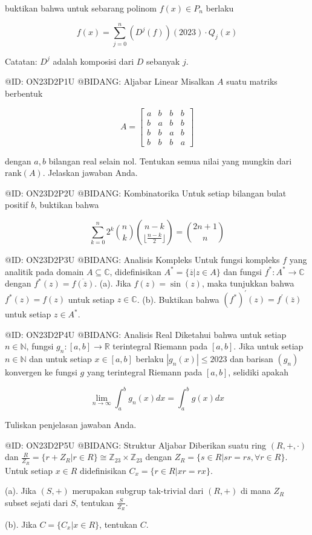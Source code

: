 buktikan bahwa untuk sebarang polinom $f(x)\in P_{n}$ berlaku

$$
f(x)=\sum_{j=0}^{n}(D^{j}(f))(2023)\cdot Q_{j}(x)
$$

Catatan: $D^{j}$ adalah komposisi dari $D$ sebanyak $j$.

@ID: ON23D2P1U
@BIDANG: Aljabar Linear
Misalkan $A$ suatu matriks berbentuk

$$
A=\begin{bmatrix}a&b&b&b\\ b&a&b&b\\ b&b&a&b\\ b&b&b&a\end{bmatrix}
$$

dengan $a, b$ bilangan real selain nol. Tentukan semua nilai yang mungkin dari $\text{rank}(A)$. Jelaskan jawaban Anda.

@ID: ON23D2P2U
@BIDANG: Kombinatorika
Untuk setiap bilangan bulat positif $b$, buktikan bahwa

$$
\sum_{k=0}^{n}2^{k}\binom{n}{k}\binom{n-k}{\lfloor\frac{n-k}{2}\rfloor}=\binom{2n+1}{n}
$$

@ID: ON23D2P3U
@BIDANG: Analisis Kompleks
Untuk fungsi kompleks $f$ yang analitik pada domain $A\subseteq\mathbb{C}$, didefinisikan $A^{*}=\{\overline{z}|z\in A\}$ dan fungsi $f^{*}:A^{*}\rightarrow\mathbb{C}$ dengan $f^{*}(z)=\overline{f(\overline{z})}$.
(a). Jika $f(z)=\sin(z)$, maka tunjukkan bahwa $f^{*}(z)=f(z)$ untuk setiap $z\in\mathbb{C}$.
(b). Buktikan bahwa $(f^{*})^{\prime}(z)=f^{\prime}(\overline{z})$ untuk setiap $z\in A^{*}$.

@ID: ON23D2P4U
@BIDANG: Analisis Real
Diketahui bahwa untuk setiap $n\in\mathbb{N}$, fungsi $g_{n}:[a,b]\rightarrow\mathbb{R}$ terintegral Riemann pada $[a,b]$. Jika untuk setiap $n\in\mathbb{N}$ dan untuk setiap $x\in[a,b]$ berlaku $|g_{n}(x)|\le2023$ dan barisan $(g_{n})$ konvergen ke fungsi $g$ yang terintegral Riemann pada $[a,b]$, selidiki apakah

$$
\lim_{n\rightarrow\infty}\int_{a}^{b}g_{n}(x)dx=\int_{a}^{b}g(x)dx
$$

Tuliskan penjelasan jawaban Anda.

@ID: ON23D2P5U
@BIDANG: Struktur Aljabar
Diberikan suatu ring $(R, +,\cdot)$ dan $\frac{R}{Z_{R}}=\{r+Z_{R}|r\in R\}\cong\mathbb{Z}_{23}\times\mathbb{Z}_{23}$ dengan $Z_{R}=\{s\in R|sr=rs,\forall r\in R\}$. Untuk setiap $x\in R$ didefinisikan $C_{x}=\{r\in R|xr=rx\}$.

(a). Jika $(S,+)$ merupakan subgrup tak-trivial dari $(R,+)$ di mana $Z_{R}$ subset sejati dari $S$, tentukan $\frac{S}{Z_{R}}$.

(b). Jika $C=\{C_{x}|x\in R\}$, tentukan $C$.